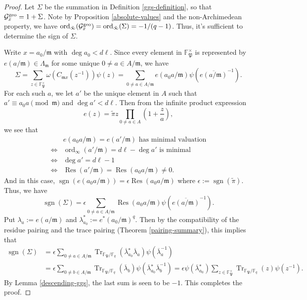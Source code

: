 \documentclass[11pt]{amsart}
\theoremstyle{plain}
\theoremstyle{definition}
\theoremstyle{remark}
\numberwithin{equation}{section}
\newcommand{\FF}{\mathbb{F}}
\newcommand{\mfk}{\mathfrak{m}}
\newcommand{\Pfk}{\mathfrak{P}}
\newcommand{\Gcal}{\mathcal{G}}
\newcommand{\Tr}{\operatorname{Tr}}
\newcommand{\sgn}{\operatorname{sgn}}
\newcommand{\Res}{\operatorname{Res}}
\newcommand{\ord}{\operatorname{ord}}
\newcommand{\ovl}{\overline}
\newcommand{\td}{\tilde}
\newcommand{\Fq}{\FF_q}
\newcommand{\bggs}{\Gcal^{\textnormal{geo}}}
\let\l\ell
\begin{document}
	\begin{proof}
		Let $\Sigma$ be the summation in Definition \ref{ggs-definition}, so that $\bggs_x = 1 + \Sigma$.
		Note by Proposition \ref{absolute-values} and the non-Archimedean property, we have $\ord_{\td{\infty}}(\bggs_x) = \ord_{\td{\infty}} (\Sigma) = -1/(q-1)$.
		Thus, it's sufficient to determine the sign of $\Sigma$.
		
		Write $x = a_0/\mfk$ with $\deg a_0 < d\l$.
		Since every element in $\FF_{\Pfk}^\times$ is represented by $e(a/\mfk) \in \Lambda_{\mfk}$ for some unique $0 \neq a \in A/\mfk$, we have
		$$
		\Sigma
		= \sum_{z \in \FF_{\Pfk}^\times} \omega\left(C_{\mfk x} (z^{-1})\right)\psi(z)
		= \sum_{0 \neq a \in A/\mfk} e(a_0a/\mfk) \psi\left( \ovl{e(a/\mfk)}^{-1} \right).
		$$
		For each such $a$, we let $a'$ be the unique element in $A$ such that $a' \equiv a_0a \pmod{\mfk}$ and $\deg a' < d\l$.
		Then from the infinite product expression
		$$
		e(z) = \td{\pi}z \prod_{0 \neq a \in A} \left( 1+\frac{z}{a} \right),
		$$
		we see that
		\begin{align*}
			&e(a_0a/\mfk) = e(a'/\mfk) \text{ has minimal valuation}   \\
			\iff{} &\ord_{\infty}(a'/\mfk) = d\l - \deg a' \text{ is minimal}   \\
			\iff{} &\deg a' = d\l-1     \\
			\iff{} &\Res(a'/\mfk) = \Res(a_0a/\mfk)\neq 0.
		\end{align*}
		And in this case, $\sgn(e(a_0a/\mfk)) = \epsilon \Res(a_0a/\mfk)$ where $\epsilon := \sgn(\td{\pi})$.
		Thus, we have
		$$
		\sgn(\Sigma)
		= \epsilon \sum_{0 \neq a \in A/\mfk} \Res(a_0a/\mfk) \psi\left( \ovl{e(a/\mfk)}^{-1} \right).
		$$
		Put $\lambda_a := e(a/\mfk)$ and $\lambda_{a_0}^* := e^*(a_0/\mfk)^q$.
		Then by the compatibility of the residue pairing and the trace pairing (Theorem \ref{pairing-summary}), this implies that
		\begin{align*}
			\sgn(\Sigma)
			&= \epsilon \sum_{0 \neq a \in A/\mfk} \Tr_{\FF_\Pfk/\Fq} (\ovl{\lambda}{}^*_{a_0} \ovl{\lambda}_a) \psi \left( \ovl{\lambda}_a^{-1} \right)   \\
			&= \epsilon \sum_{0 \neq b \in A/\mfk} \Tr_{\FF_\Pfk/\Fq}(\ovl{\lambda}_b) \psi\left( \ovl{\lambda}{}^*_{a_0} \ovl{\lambda}_b^{-1} \right)
			= \epsilon \psi\left( \ovl{\lambda}{}^*_{a_0} \right) \sum_{z \in \FF_{\Pfk}^\times} \Tr_{\FF_\Pfk/\Fq}(z) \psi(z^{-1}).
		\end{align*}
		By Lemma \ref{descending-ggs}, the last sum is seen to be $-1$.
		This completes the proof.
	\end{proof}
	
	\printbibliography
	
\end{document}

